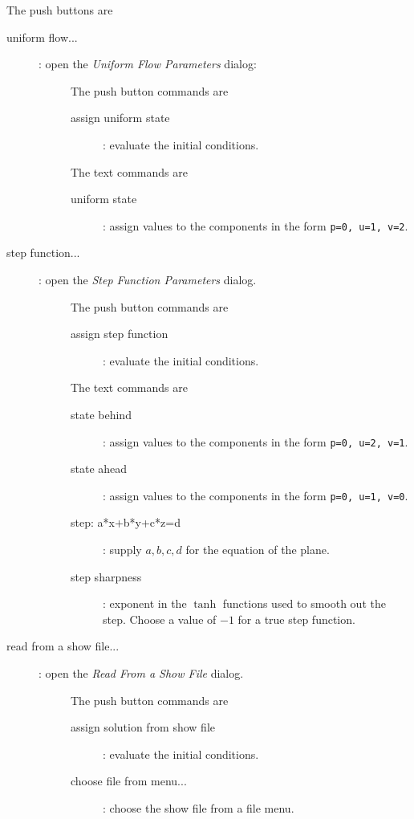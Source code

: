 \noindent The push buttons are
\begin{description}
  \item[\qquad uniform flow...] : open the {\em Uniform Flow Parameters} dialog:
     \begin{description}
         \item[]
        \noindent The push button commands are
       \begin{description}
         \item[\qquad assign uniform state] : evaluate the initial conditions.
       \end{description}

       \noindent The text commands are
       \begin{description}
         \item[\qquad uniform state] : assign values to the components in the form {\tt p=0, u=1, v=2}.
       \end{description}
    \end{description}
     
  \item[\qquad step function...] : open the {\em Step Function Parameters} dialog.
    \begin{description}
         \item[]
        \noindent The push button commands are
       \begin{description}
         \item[\qquad assign step function] : evaluate the initial conditions.
       \end{description}

       \noindent The text commands are
       \begin{description}
         \item[\qquad state behind] : assign values to the components in the form {\tt p=0, u=2, v=1}.
         \item[\qquad state ahead] : assign values to the components in the form {\tt p=0, u=1, v=0}.
         \item[\qquad step: a*x+b*y+c*z=d] : supply $a,b,c,d$ for the equation of the plane.
         \item[\qquad step sharpness] : exponent in the $\tanh$ functions used to smooth out the step. Choose
                       a value of $-1$ for a true step function.
       \end{description}
    \end{description}

  \item[\qquad read from a show file...] : open the {\em Read From a Show File} dialog.
    \begin{description}
         \item[]
        \noindent The push button commands are
       \begin{description}
         \item[\qquad assign solution from show file] : evaluate the initial conditions.
         \item[\qquad choose file from menu...] : choose the show file from a file menu.
       \end{description}


\end{description}
\end{description}
